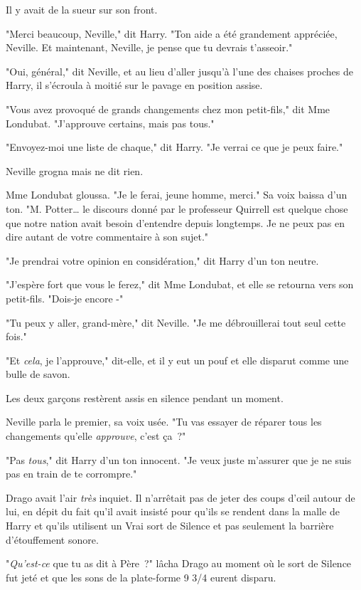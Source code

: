 Il y avait de la sueur sur son front.

"Merci beaucoup, Neville," dit Harry. "Ton aide a été grandement appréciée, Neville. Et maintenant, Neville, je pense que tu devrais t'asseoir."

"Oui, général," dit Neville, et au lieu d'aller jusqu'à l'une des chaises proches de Harry, il s'écroula à moitié sur le pavage en position assise.

"Vous avez provoqué de grands changements chez mon petit-fils," dit Mme Londubat. "J'approuve certains, mais pas tous."

"Envoyez-moi une liste de chaque," dit Harry. "Je verrai ce que je peux faire."

Neville grogna mais ne dit rien.

Mme Londubat gloussa. "Je le ferai, jeune homme, merci." Sa voix baissa d'un ton. "M. Potter… le discours donné par le professeur Quirrell est quelque chose que notre nation avait besoin d'entendre depuis longtemps. Je ne peux pas en dire autant de votre commentaire à son sujet."

"Je prendrai votre opinion en considération," dit Harry d'un ton neutre.

"J'espère fort que vous le ferez," dit Mme Londubat, et elle se retourna vers son petit-fils. "Dois-je encore -"

"Tu peux y aller, grand-mère," dit Neville. "Je me débrouillerai tout seul cette fois."

"Et \emph{cela}, je l'approuve," dit-elle, et il y eut un pouf et elle disparut comme une bulle de savon.

Les deux garçons restèrent assis en silence pendant un moment.

Neville parla le premier, sa voix usée. "Tu vas essayer de réparer tous les changements qu'elle \emph{approuve}, c'est ça~?"

"Pas \emph{tous}," dit Harry d'un ton innocent. "Je veux juste m'assurer que je ne suis pas en train de te corrompre."

\later

Drago avait l'air \emph{très} inquiet. Il n'arrêtait pas de jeter des coups d'œil autour de lui, en dépit du fait qu'il avait insisté pour qu'ils se rendent dans la malle de Harry et qu'ils utilisent un Vrai sort de Silence et pas seulement la barrière d'étouffement sonore.

"\emph{Qu'est-ce} que tu as dit à Père~?" lâcha Drago au moment où le sort de Silence fut jeté et que les sons de la plate-forme 9 3/4 eurent disparu.

